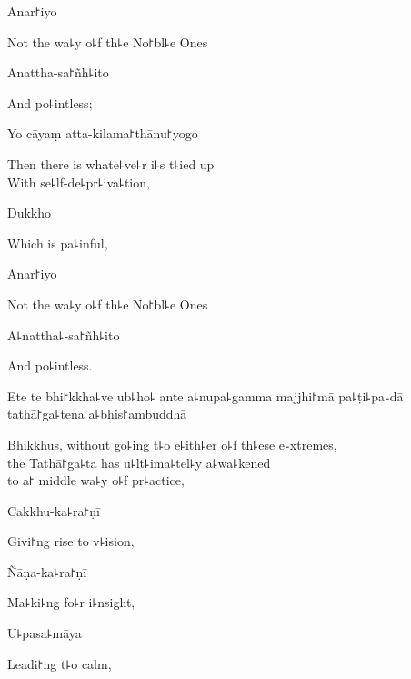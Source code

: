 Anar꜓iyo

\begin{english}
  Not the wa꜕y o꜕f th꜕e No꜓bl꜕e Ones
\end{english}

Anattha-sa꜓ñh꜕ito

\begin{english}
  And po꜕intless;
\end{english}

Yo cāyaṃ atta-kilama꜓thānu꜓yogo

\begin{english}
  Then there is whate꜕ve꜕r i꜕s t꜕ied up\\
  With se꜕lf-de꜕pr꜕iva꜕tion,
\end{english}

Dukkho

\begin{english}
  Which is pa꜕inful,
\end{english}

Anar꜓iyo

\begin{english}
  Not the wa꜕y o꜕f th꜕e No꜓bl꜕e Ones
\end{english}

A꜕nattha꜕-sa꜓ñh꜕ito

\begin{english}
  And po꜕intless.
\end{english}

Ete te bhi꜓kkha꜕ve ub꜕ho꜕ ante a꜕nupa꜕gamma majjhi꜓mā pa꜕ṭi꜕pa꜕dā tathā꜓ga꜕tena a꜕bhis꜓ambuddhā

\begin{english}
  Bhikkhus, without go꜕ing t꜕o e꜕ith꜕er o꜕f th꜕ese e꜕xtremes,\\
  the Tathā꜓ga꜕ta has u꜕lt꜕ima꜕tel꜕y a꜕wa꜕kened\\
  to a꜓ middle wa꜕y o꜕f pr꜕actice,
\end{english}

Cakkhu-ka꜕ra꜓ṇī

\begin{english}
  Givi꜓ng rise to v꜕ision,
\end{english}

Ñāṇa-ka꜕ra꜓ṇī

\begin{english}
  Ma꜕ki꜕ng fo꜕r i꜕nsight,
\end{english}

U꜕pasa꜕māya

\begin{english}
  Leadi꜓ng t꜕o calm,
\end{english}

